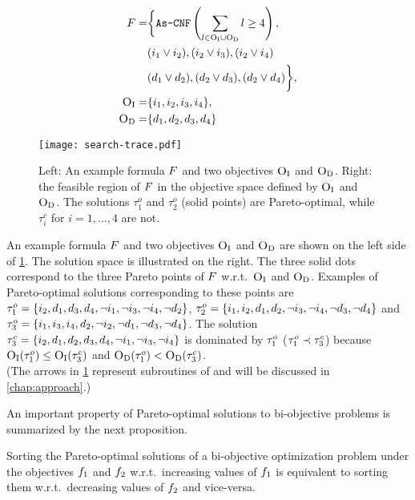 \begin{figure}
  \begin{minipage}{0.377\textwidth}
    \small
    \begin{align*}
      F = &\bigg\{ \texttt{As-CNF}\left(\sum_ {l \in \textsc{O}_{\text{I}} \cup \textsc{O}_{\text{D}}} l \geq 4 \right), \\
        &(i_1 \lor i_2), (i_2 \lor i_3), (i_2 \lor i_4) \\
        &(d_1 \lor d_2), (d_2 \lor d_3), (d_2 \lor d_4) \bigg\}, \\
      \textsc{O}_{\text{I}} =&\{ i_1, i_2, i_3, i_4 \}, \\
      \textsc{O}_{\text{D}} =&\{ d_1, d_2, d_3, d_4 \} 
    \end{align*}
  \end{minipage}
  \;
  \begin{minipage}{0.605\textwidth}
    \texttt{[image: search-trace.pdf]}
  \end{minipage}
  \caption{Left: An example formula $F$ and two objectives $\textsc{O}_{\text{I}}$ and $\textsc{O}_{\text{D}}$.
    Right: the feasible region of $F$ in the objective space defined by $\textsc{O}_{\text{I}}$ and $\textsc{O}_{\text{D}}$.
    The solutions $\tau^o_1$ and $\tau^o_2$ (solid points) are Pareto-optimal, while $\tau^c_i$ for $i=1,\ldots,4$ are not.\label{fig:search-trace}}
\end{figure}
\begin{example}\label{ex:main}
  An example formula $F$ and two objectives $\textsc{O}_{\text{I}}$ and $\textsc{O}_{\text{D}}$ are shown on the left side of \cref{fig:search-trace}. 
  The solution space is illustrated on the right.
  The three solid dots correspond to the three Pareto points of $F$ w.r.t.\ $\textsc{O}_{\text{I}}$ and $\textsc{O}_{\text{D}}$. 
  Examples of Pareto-optimal solutions corresponding to these points are $\tau^o_1 = \{i_2,\allowbreak d_1,\allowbreak d_3,\allowbreak d_4,\allowbreak \lnot i_1,\allowbreak \lnot i_3,\allowbreak \lnot i_4,\allowbreak \lnot d_2\}$, $\tau^o_2 = \{i_1,\allowbreak i_2,\allowbreak d_1,\allowbreak d_2,\allowbreak \lnot i_3,\allowbreak \lnot i_4,\allowbreak \lnot d_3,\allowbreak \lnot d_4\}$ and $\tau^o_3 = \{i_1,\allowbreak i_3,\allowbreak i_4,\allowbreak d_2,\allowbreak \lnot i_2,\allowbreak \lnot d_1,\allowbreak \lnot d_3,\allowbreak \lnot d_4\}$.
  The solution $\tau^c_3 = \{i_2,\allowbreak d_1,\allowbreak d_2,\allowbreak d_3,\allowbreak d_4,\allowbreak \lnot i_1,\allowbreak \lnot i_3,\allowbreak \lnot i_4\}$ is dominated by $\tau^o_1$ ($\tau^o_1 \prec \tau^c_3$) because $\textsc{O}_{\text{I}}(\tau^o_1) \leq \textsc{O}_{\text{I}}(\tau^c_3)$ and $\textsc{O}_{\text{D}}(\tau^o_1) < \textsc{O}_{\text{D}}(\tau^c_3)$. \\
  (The arrows in \cref{fig:search-trace} represent subroutines of \algname{} and will be discussed in \cref{chap:approach}.)
\end{example}

An important property of Pareto-optimal solutions to bi-objective problems is summarized by the next proposition.
\begin{proposition} \label{prop:biobjective}
  Sorting the Pareto-optimal solutions of a bi-objective optimization problem under the objectives $f_1$ and $f_2$ w.r.t.\ increasing values of $f_1$ is equivalent to sorting them w.r.t.\ decreasing values of $f_2$ and vice-versa.
\end{proposition}

